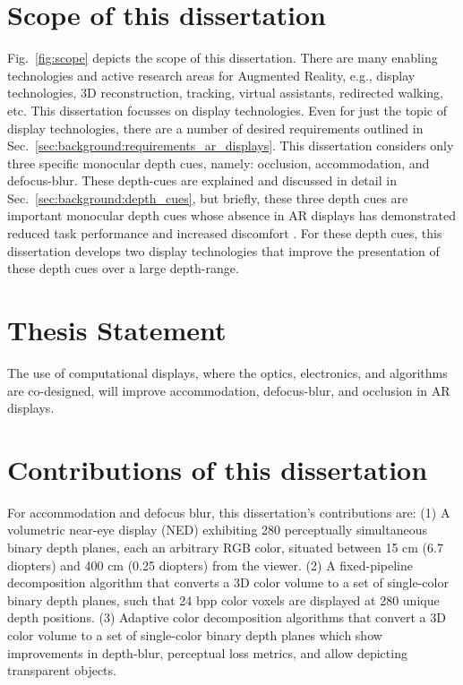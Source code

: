 \section{Scope of this dissertation}

Fig.~\ref{fig:scope} depicts the scope of this dissertation. 
There are many enabling technologies and active research areas for Augmented Reality, e.g., display technologies, 3D reconstruction, tracking, virtual assistants, redirected walking, etc. 
This dissertation focusses on display technologies. 
Even for just the topic of display technologies, there are a number of desired requirements outlined in Sec.~\ref{sec:background:requirements_ar_displays}. 
This dissertation considers only three specific monocular depth cues, namely: occlusion, accommodation, and defocus-blur. 
These depth-cues are explained and discussed in detail in Sec.~\ref{sec:background:depth_cues}, but briefly, these three depth cues are important monocular depth cues whose absence in AR displays has demonstrated reduced task performance and increased discomfort \cite{lambooij2009visual,shibata2011zone,wann1995natural}. 
For these depth cues, this dissertation develops two display technologies that improve the presentation of these depth cues over a large depth-range.

\section{Thesis Statement}
The use of computational displays, where the optics, electronics, and algorithms are co-designed, will improve accommodation, defocus-blur, and occlusion in AR displays.

\section{Contributions of this dissertation}
For accommodation and defocus blur, this dissertation’s contributions are: 
(1) A volumetric near-eye display (NED) exhibiting 280 perceptually simultaneous binary depth planes, each an arbitrary RGB color, situated between 15 cm (6.7 diopters) and 400 cm (0.25 diopters) from the viewer. 
(2) A fixed-pipeline decomposition algorithm that converts a 3D color volume to a set of single-color binary depth planes, such that 24 bpp color voxels are displayed at 280 unique depth positions. 
(3) Adaptive color decomposition algorithms that convert a 3D color volume to a set of single-color binary depth planes which show improvements in depth-blur, perceptual loss metrics, and allow depicting transparent objects.


